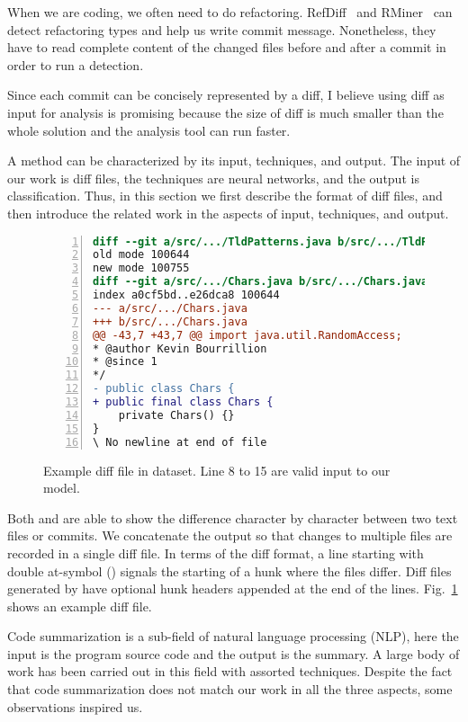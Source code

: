 When we are coding, we often need to do refactoring.
RefDiff~\cite{silva2020refdiff} and RMiner~\cite{tsantalis2018accurate} can detect refactoring types and help us write commit message. Nonetheless, they have to read complete content of the changed files before and after a commit in order to run a detection.

Since each commit can be concisely represented by a diff, I believe using diff as input for analysis is promising because the size of diff is much smaller than the whole solution and the analysis tool can run faster.




A method can be characterized by its input, techniques, and output.
The input of our work is diff files, the techniques are neural networks, and the output is classification.
Thus, in this section we first describe the format of diff files, and then introduce the related work in the aspects of input, techniques, and output.


\begin{figure}[t]
\begin{lstlisting}[language=diff, breaklines=true, numbers=left, xleftmargin=2em]
diff --git a/src/.../TldPatterns.java b/src/.../TldPatterns.java
old mode 100644
new mode 100755
diff --git a/src/.../Chars.java b/src/.../Chars.java
index a0cf5bd..e26dca8 100644
--- a/src/.../Chars.java
+++ b/src/.../Chars.java
@@ -43,7 +43,7 @@ import java.util.RandomAccess;
* @author Kevin Bourrillion
* @since 1
*/
- public class Chars {
+ public final class Chars {
	private Chars() {}
}
\ No newline at end of file
\end{lstlisting}
\caption{Example diff file in dataset. Line 8 to 15 are valid input to our model.}
\label{fig:example-diff}
\end{figure}

Both {\gnudiff} and {\gitdiff} are able to show the difference character by character between two text files or commits.
We concatenate the output so that changes to multiple files are recorded in a single diff file.
In terms of the diff format, a line starting with double at-symbol () signals the starting of a hunk where the files differ.
Diff files generated by {\gitdiff} have optional hunk headers appended at the end of the  lines.
Fig.~\ref{fig:example-diff} shows an example diff file.

Code summarization is a sub-field of natural language processing (NLP),
here the input is the program source code and the output is the summary.
A large body of work has been carried out in this field with assorted techniques.
Despite the fact that code summarization does not match our work in all the three aspects,
some observations inspired us.

